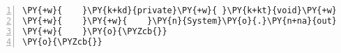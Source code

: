 \begin{Verbatim}[commandchars=\\\{\},numbers=left,firstnumber=1,stepnumber=1,frame=single,fontsize=\small]
\PY{+w}{    }\PY{k+kd}{private}\PY{+w}{ }\PY{k+kt}{void}\PY{+w}{ }\PY{n+nf}{output}\PY{o}{(}\PY{n}{QuotientAndRemainder}\PY{+w}{ }\PY{n}{output}\PY{o}{)}\PY{+w}{ }\PY{o}{\PYZob{}}
\PY{+w}{    }\PY{+w}{    }\PY{n}{System}\PY{o}{.}\PY{n+na}{out}\PY{o}{.}\PY{n+na}{print}\PY{o}{(}\PY{l+s}{"商は"}\PY{+w}{ }\PY{o}{+}\PY{+w}{ }\PY{n}{output}\PY{o}{.}\PY{n+na}{quotient}\PY{+w}{ }\PY{o}{+}\PY{+w}{ }\PY{l+s}{"で余は"}\PY{+w}{ }\PY{o}{+}\PY{+w}{ }\PY{n}{output}\PY{o}{.}\PY{n+na}{remainder}\PY{+w}{ }\PY{o}{+}\PY{+w}{ }\PY{l+s}{"です"}\PY{o}{)}\PY{o}{;}
\PY{+w}{    }\PY{o}{\PYZcb{}}
\PY{o}{\PYZcb{}}
\end{Verbatim}
